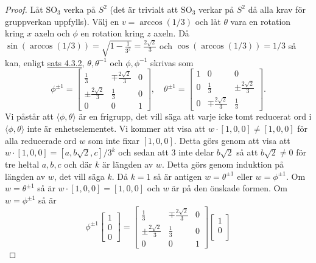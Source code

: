 \documentclass{article}
\theoremstyle{definition}
\begin{document}
\begin{proof}
  Låt $\text{SO}_3$ verka på $S^2$ (det är trivialt att $\text{SO}_3$ verkar på $S^2$ då alla krav för gruppverkan uppfylls).
  Välj en $v = \arccos(1/3)$ och låt $\theta$ vara en rotation kring $x$ axeln och $\phi$ en rotation kring $z$ axeln. Då 
  $\sin(\arccos(1/3)) = \sqrt{1 - \frac{1}{3^2}} = \frac{2 \sqrt{2}}{3}$ och $\cos(\arccos(1/3)) = 1/3$ så kan, enligt \hyperlink{sats5.3.2}{sats 4.3.2},
  $\theta, \theta^{-1}$ och $\phi, \phi^{-1}$ skrivas som 
  \[
  \phi^{\pm 1} = 
  \begin{bmatrix}
    \frac{1}{3} & \mp \frac{2 \sqrt{2}}{3} & 0 \\
    \pm \frac{2 \sqrt{2}}{3} & \frac{1}{3} & 0 \\
    0 & 0 & 1
  \end{bmatrix}, \quad
  \theta^{\pm 1} = 
  \begin{bmatrix}
    1 & 0 & 0 \\
    0 & \frac{1}{3} & \pm \frac{2 \sqrt{2}}{3} \\
    0 & \mp \frac{2 \sqrt{2}}{3} & \frac{1}{3}
  \end{bmatrix}.
  \]
  Vi påstår att $\langle \phi, \theta \rangle$ är en frigrupp, det vill säga att varje icke tomt reducerat ord i $\langle \phi, \theta \rangle$ 
  inte är enhetselementet. Vi kommer att visa att $w \cdot [1, 0, 0] \neq [1, 0, 0]$ för alla reducerade ord $w$ som inte fixar $[1, 0, 0]$. 
  Detta görs genom att visa att $w \cdot [1, 0, 0] = [a, b\sqrt{2}, c]/3^k$ och sedan att $3$ inte delar $b \sqrt{2}$ så att $b \sqrt{2} \neq 0$ för 
  tre heltal $a, b, c$ och där $k$ är längden av $w$. Detta görs genom induktion på längden av $w$, det vill säga $k$. Då $k = 1$
  så är antigen $w = \theta^{\pm 1}$ eller $w = \phi^{\pm 1}$. Om $w = \theta^{\pm 1}$ så är $w \cdot [1, 0, 0] = [1, 0, 0]$ och $w$ är på 
  den önskade formen. Om $w = \phi^{\pm 1}$ så är 
  \[\phi^{\pm 1}
  \begin{bmatrix}
    1 \\
    0 \\
    0
  \end{bmatrix} = 
  \begin{bmatrix}
    \frac{1}{3} & \mp \frac{2 \sqrt{2}}{3} & 0 \\
    \pm \frac{2 \sqrt{2}}{3} & \frac{1}{3} & 0 \\
    0 & 0 & 1
  \end{bmatrix}
  \begin{bmatrix}
    1 \\
    0 \\

\end{bmatrix}\]
\end{proof}
\end{document}
